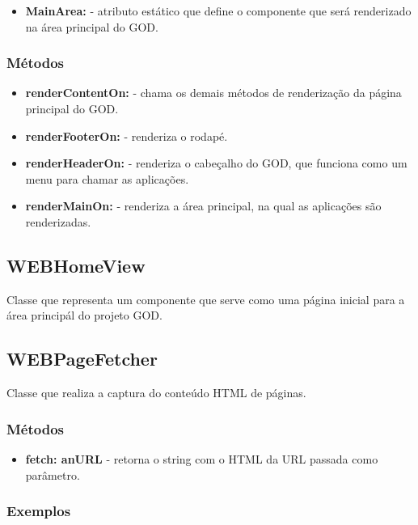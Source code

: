 \begin{itemize}
 \item \textbf{MainArea:} - atributo estático que define o componente que será renderizado na área principal do GOD.
\end{itemize}

\subsubsection{Métodos}

\begin{itemize}
 \item \textbf{renderContentOn:} - chama os demais métodos de renderização da página principal do GOD.
 \item \textbf{renderFooterOn:} - renderiza o rodapé.
 \item \textbf{renderHeaderOn:} - renderiza o cabeçalho do GOD, que funciona como um menu para chamar as aplicações.
 \item \textbf{renderMainOn:} - renderiza a área principal, na qual as aplicações são renderizadas.
\end{itemize}


\subsection{WEBHomeView} 

Classe que representa um componente que serve como uma página inicial para a área principál do projeto GOD.


\subsection{WEBPageFetcher} 

Classe que realiza a captura do conteúdo HTML de páginas.

\subsubsection{Métodos}

\begin{itemize}
 \item \textbf{fetch: anURL} - retorna o string com o HTML da URL passada como parâmetro.
\end{itemize}

\subsubsection{Exemplos}

